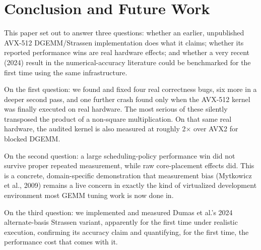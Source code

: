 \documentclass[acmsmall]{acmart}
\begin{document}
\section{Conclusion and Future Work}
\label{sec:future}

This paper set out to answer three questions: whether an earlier,
unpublished AVX-512 DGEMM/Strassen implementation does what it claims;
whether its reported performance wins are real hardware effects; and
whether a very recent (2024) result in the numerical-accuracy
literature could be benchmarked for the first time using the same
infrastructure.

On the first question: we found and fixed four real correctness bugs,
six more in a deeper second pass, and one further crash found only when
the AVX-512 kernel was finally executed on real hardware. The most
serious of these silently transposed the product of a non-square
multiplication. On that same real hardware, the audited kernel is also
measured at roughly 2$\times$ over AVX2 for blocked DGEMM.

On the second question: a large scheduling-policy performance win did
not survive proper repeated measurement, while raw core-placement
effects did. This is a concrete, domain-specific demonstration that
measurement bias (Mytkowicz et al., 2009) remains a live concern in
exactly the kind of virtualized development environment most GEMM
tuning work is now done in.

On the third question: we implemented and measured Dumas et al.'s 2024
alternate-basis Strassen variant, apparently for the first time under
realistic execution, confirming its accuracy claim and quantifying, for
the first time, the performance cost that comes with it.
\end{document}

